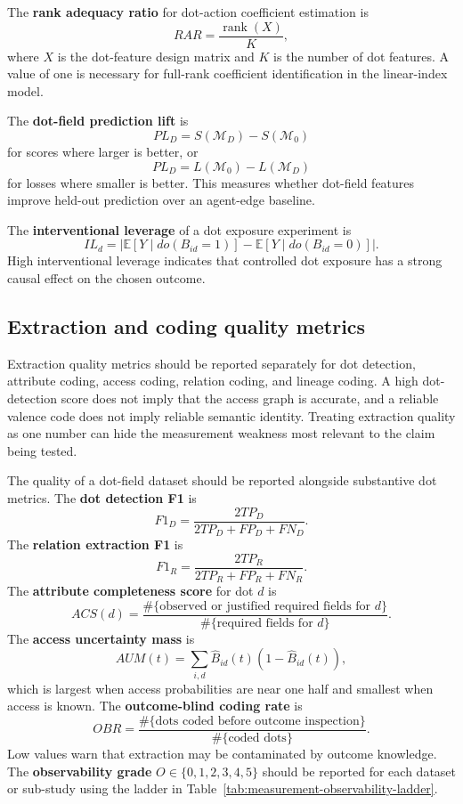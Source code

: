 \documentclass[11pt]{article}
\theoremstyle{remark}
\begin{document}
The \textbf{rank adequacy ratio} for dot-action coefficient estimation is
$$
RAR=\frac{\operatorname{rank}(X)}{K},
$$
where $X$ is the dot-feature design matrix and $K$ is the number of dot
features. A value of one is necessary for full-rank coefficient
identification in the linear-index model.

The \textbf{dot-field prediction lift} is
$$
PL_D=S(\mathcal M_D)-S(\mathcal M_0)
$$
for scores where larger is better, or
$$
PL_D=L(\mathcal M_0)-L(\mathcal M_D)
$$
for losses where smaller is better. This measures whether dot-field
features improve held-out prediction over an agent-edge baseline.

The \textbf{interventional leverage} of a dot exposure experiment is
$$
IL_d=\left|\mathbb E[Y\mid do(B_{id}=1)]-\mathbb E[Y\mid do(B_{id}=0)]\right|.
$$
High interventional leverage indicates that controlled dot exposure has
a strong causal effect on the chosen outcome.


\subsection{Extraction and coding quality metrics}\label{extraction-coding-quality-metrics}

Extraction quality metrics should be reported separately for dot detection, attribute coding, access coding, relation coding, and lineage coding. A high dot-detection score does not imply that the access graph is accurate, and a reliable valence code does not imply reliable semantic identity. Treating extraction quality as one number can hide the measurement weakness most relevant to the claim being tested.


The quality of a dot-field dataset should be reported alongside substantive dot metrics. The \textbf{dot detection F1} is
\[
F1_D=\frac{2TP_D}{2TP_D+FP_D+FN_D}.
\]
The \textbf{relation extraction F1} is
\[
F1_R=\frac{2TP_R}{2TP_R+FP_R+FN_R}.
\]
The \textbf{attribute completeness score} for dot \(d\) is
\[
ACS(d)=\frac{\#\{\text{observed or justified required fields for }d\}}
{\#\{\text{required fields for }d\}}.
\]
The \textbf{access uncertainty mass} is
\[
AUM(t)=\sum_{i,d}\widehat B_{id}(t)(1-\widehat B_{id}(t)),
\]
which is largest when access probabilities are near one half and smallest when access is known. The \textbf{outcome-blind coding rate} is
\[
OBR=\frac{\#\{\text{dots coded before outcome inspection}\}}
{\#\{\text{coded dots}\}}.
\]
Low values warn that extraction may be contaminated by outcome knowledge. The \textbf{observability grade} \(O\in\{0,1,2,3,4,5\}\) should be reported for each dataset or sub-study using the ladder in Table~\ref{tab:measurement-observability-ladder}.
\end{document}
